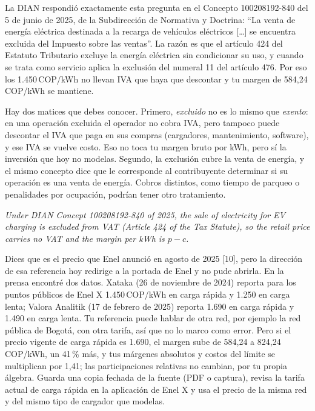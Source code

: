 \documentclass[11pt]{article}
\newenvironment{eng}{\begin{otherlanguage}{english}\itshape}{\end{otherlanguage}}
\begin{document}
\begin{idea}
La DIAN respondió exactamente esta pregunta en el Concepto 100208192-840 del 5 de junio de 2025, de la Subdirección de Normativa y Doctrina: ``La venta de energía eléctrica destinada a la recarga de vehículos eléctricos [\ldots] se encuentra excluida del Impuesto sobre las ventas''. La razón es que el artículo 424 del Estatuto Tributario excluye la energía eléctrica sin condicionar su uso, y cuando se trata como servicio aplica la exclusión del numeral 11 del artículo 476. Por eso los 1.450\,COP/kWh no llevan IVA que haya que descontar y tu margen de 584,24\,COP/kWh se mantiene.

Hay dos matices que debes conocer. Primero, \emph{excluido} no es lo mismo que \emph{exento}: en una operación excluida el operador no cobra IVA, pero tampoco puede descontar el IVA que paga en sus compras (cargadores, mantenimiento, software), y ese IVA se vuelve costo. Eso no toca tu margen bruto por kWh, pero sí la inversión que hoy no modelas. Segundo, la exclusión cubre la venta de energía, y el mismo concepto dice que le corresponde al contribuyente determinar si su operación es una venta de energía. Cobros distintos, como tiempo de parqueo o penalidades por ocupación, podrían tener otro tratamiento.
\end{idea}

\begin{ejemplo}
\begin{eng}
Under DIAN Concept 100208192-840 of 2025, the sale of electricity for EV charging is excluded from VAT (Article 424 of the Tax Statute), so the retail price carries no VAT and the margin per kWh is $p - c$.
\end{eng}
\end{ejemplo}

\begin{duda}
Dices que es el precio que Enel anunció en agosto de 2025 [10], pero la dirección de esa referencia hoy redirige a la portada de Enel y no pude abrirla. En la prensa encontré dos datos. Xataka (26 de noviembre de 2024) reporta para los puntos públicos de Enel X 1.450\,COP/kWh en carga rápida y 1.250 en carga lenta; Valora Analitik (17 de febrero de 2025) reporta 1.690 en carga rápida y 1.490 en carga lenta. Tu referencia puede hablar de otra red, por ejemplo la red pública de Bogotá, con otra tarifa, así que no lo marco como error. Pero si el precio vigente de carga rápida es 1.690, el margen sube de 584,24 a 824,24\,COP/kWh, un 41\,\% más, y tus márgenes absolutos y costos del límite se multiplican por 1,41; las participaciones relativas no cambian, por tu propia álgebra. Guarda una copia fechada de la fuente (PDF o captura), revisa la tarifa actual de carga rápida en la aplicación de Enel X y usa el precio de la misma red y del mismo tipo de cargador que modelas.
\end{duda}
\end{document}
